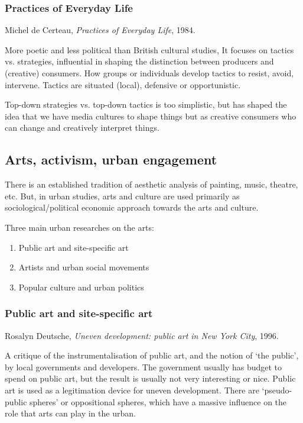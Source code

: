 \documentclass{article}
\begin{document}
\subsubsection{Practices of Everyday Life}

Michel de Certeau, \textit{Practices of Everyday Life}, 1984. 

More poetic and less political than British cultural studies, It focuses on tactics vs. strategies, influential in shaping the distinction between producers and (creative) consumers. How groups or individuals develop tactics to resist, avoid, intervene. Tactics are situated (local), defensive or opportunistic.

Top-down strategies vs. top-down tactics is too simplistic, but has shaped the idea that we have media cultures to shape things but as creative consumers who can change and creatively interpret things.

\subsection{Arts, activism, urban engagement}

There is an established tradition of aesthetic analysis of painting, music, theatre, etc. But, in urban studies, arts and culture are used primarily as sociological/political economic approach towards the arts and culture.

Three main urban researches on the arts: 

\begin{enumerate}
	\item Public art and site-specific art
	\item Artists and urban social movements
	\item Popular culture and urban politics
\end{enumerate}

\subsubsection{Public art and site-specific art}

Rosalyn Deutsche, \textit{Uneven development: public art in New York City}, 1996.

A critique of the instrumentalisation of public art, and the notion of `the public', by local governments and developers. The government usually has budget to spend on public art, but the result is usually not very interesting or nice. Public art is used as a legitimation device for uneven development. There are `pseudo-public spheres' or oppositional spheres, which have a massive influence on the role that arts  can play in the urban.
\end{document}
